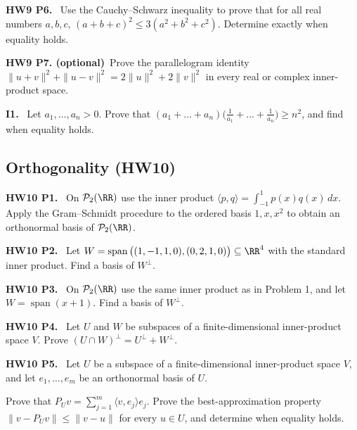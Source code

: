\documentclass[10pt]{scrartcl}
\DeclareMathOperator{\spn}{span}
\newcommand{\PP}{\mathcal P}
\newcommand{\ip}[2]{\langle #1,#2\rangle}
\newenvironment{prob}{\par\bigskip\noindent\begin{minipage}{\linewidth}\setlength{\parskip}{4pt}}{\end{minipage}\par}
\begin{document}
\begin{prob}
\textbf{HW9 P6. }\ Use the Cauchy--Schwarz inequality to prove that for all real numbers $a,b,c$, $(a+b+c)^2\le3(a^2+b^2+c^2)$. Determine exactly when equality holds.
\end{prob}

\begin{prob}
\textbf{HW9 P7. (optional)}\ Prove the parallelogram identity $\|u+v\|^2+\|u-v\|^2=2\|u\|^2+2\|v\|^2$ in every real or complex inner-product space.
\end{prob}




\begin{prob}
\textbf{I1. }\ Let $a_1,\dots,a_n>0$. Prove that $(a_1+\dots+a_n)\big(\frac1{a_1}+\dots+\frac1{a_n}\big)\ge n^2$, and find when equality holds.
\end{prob}

\subsection{Orthogonality (HW10)}

\begin{prob}
\textbf{HW10 P1. }\ On $\PP_2(\RR)$ use the inner product $\ip pq=\int_{-1}^1p(x)q(x)\,dx$. Apply the Gram--Schmidt procedure to the ordered basis $1,x,x^2$ to obtain an orthonormal basis of $\PP_2(\RR)$.
\end{prob}

\begin{prob}
\textbf{HW10 P2. }\ Let $W=\spn\big((1,-1,1,0),(0,2,1,0)\big)\subseteq\RR^4$ with the standard inner product. Find a basis of $W^\perp$.
\end{prob}

\begin{prob}
\textbf{HW10 P3. }\ On $\PP_2(\RR)$ use the same inner product as in Problem 1, and let $W=\spn(x+1)$. Find a basis of $W^\perp$.
\end{prob}

\begin{prob}
\textbf{HW10 P4. }\ Let $U$ and $W$ be subspaces of a finite-dimensional inner-product space $V$. Prove $(U\cap W)^\perp=U^\perp+W^\perp$.
\end{prob}

\begin{prob}
\textbf{HW10 P5. }\ Let $U$ be a subspace of a finite-dimensional inner-product space $V$, and let $e_1,\dots,e_m$ be an orthonormal basis of $U$.
\begin{enumerate}[(a)]
  \ii Prove that $P_Uv=\sum_{j=1}^m\ip v{e_j}e_j$.
  \ii Prove the best-approximation property $\|v-P_Uv\|\le\|v-u\|$ for every $u\in U$, and determine when equality holds.
\end{enumerate}
\end{prob}
\end{document}
